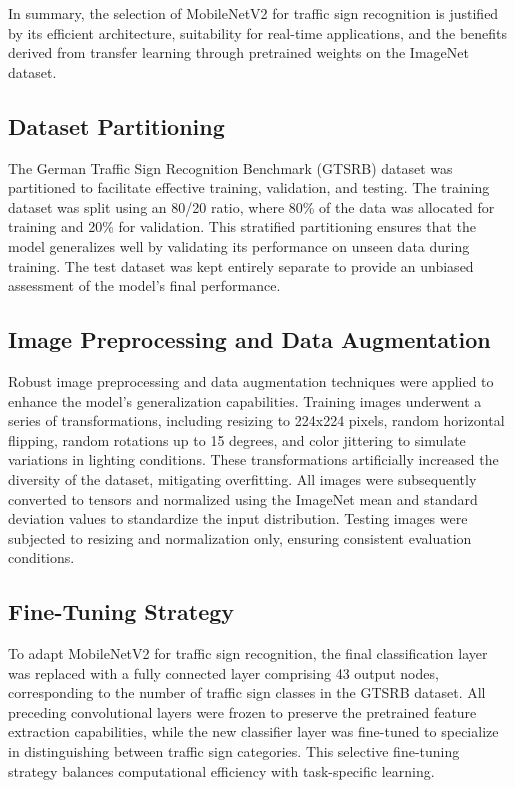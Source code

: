 In summary, the selection of MobileNetV2 for traffic sign recognition is justified by its efficient architecture, suitability for real-time applications, and the benefits derived from transfer learning through pretrained weights on the ImageNet dataset.

\subsection{Dataset Partitioning}
The German Traffic Sign Recognition Benchmark (GTSRB) dataset was partitioned to facilitate effective training, validation, and testing. The training dataset was split using an 80/20 ratio, where 80\% of the data was allocated for training and 20\% for validation. This stratified partitioning ensures that the model generalizes well by validating its performance on unseen data during training. The test dataset was kept entirely separate to provide an unbiased assessment of the model's final performance.

\subsection{Image Preprocessing and Data Augmentation}
Robust image preprocessing and data augmentation techniques were applied to enhance the model's generalization capabilities. Training images underwent a series of transformations, including resizing to 224x224 pixels, random horizontal flipping, random rotations up to 15 degrees, and color jittering to simulate variations in lighting conditions. These transformations artificially increased the diversity of the dataset, mitigating overfitting. All images were subsequently converted to tensors and normalized using the ImageNet mean and standard deviation values to standardize the input distribution. Testing images were subjected to resizing and normalization only, ensuring consistent evaluation conditions.

\subsection{Fine-Tuning Strategy}
To adapt MobileNetV2 for traffic sign recognition, the final classification layer was replaced with a fully connected layer comprising 43 output nodes, corresponding to the number of traffic sign classes in the GTSRB dataset. All preceding convolutional layers were frozen to preserve the pretrained feature extraction capabilities, while the new classifier layer was fine-tuned to specialize in distinguishing between traffic sign categories. This selective fine-tuning strategy balances computational efficiency with task-specific learning.

